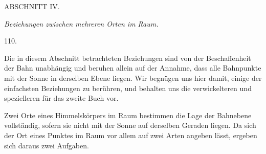 \clearpage
{}
\begin{center}
{\large ABSCHNITT IV.}\par\medskip
\emph{Beziehungen zwischen mehreren Orten im Raum.}\par\bigskip
\hypertarget{native-154-article110}{}110.
\end{center}
Die in diesem Abschnitt betrachteten Beziehungen sind von der Beschaffenheit der Bahn unabhängig und beruhen allein auf der Annahme, dass alle Bahnpunkte mit der Sonne in derselben Ebene liegen. Wir begnügen uns hier damit, einige der einfachsten Beziehungen zu berühren, und behalten uns die verwickelteren und spezielleren für das zweite Buch vor.

Zwei Orte eines Himmelskörpers im Raum bestimmen die Lage der Bahnebene vollständig, sofern sie nicht mit der Sonne auf derselben Geraden liegen. Da sich der Ort eines Punktes im Raum vor allem auf zwei Arten angeben lässt, ergeben sich daraus zwei Aufgaben.

